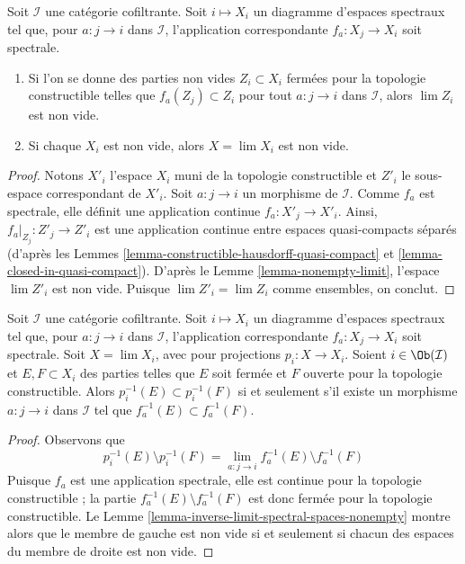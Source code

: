 \begin{lemma}
\label{lemma-inverse-limit-spectral-spaces-nonempty}
Soit $\mathcal{I}$ une catégorie cofiltrante. Soit $i \mapsto X_i$ un diagramme
d'espaces spectraux tel que, pour $a : j \to i$ dans $\mathcal{I}$,
l'application correspondante $f_a : X_j \to X_i$ soit spectrale.
\begin{enumerate}
\item Si l'on se donne des parties non vides $Z_i \subset X_i$ fermées pour
la topologie constructible telles que $f_a(Z_j) \subset Z_i$ pour tout
$a : j \to i$ dans $\mathcal{I}$, alors $\lim Z_i$ est non vide.
\item Si chaque $X_i$ est non vide, alors $X = \lim X_i$ est non vide.
\end{enumerate}
\end{lemma}

\begin{proof}
Notons $X'_i$ l'espace $X_i$ muni de la topologie constructible
et $Z'_i$ le sous-espace correspondant de $X'_i$.
Soit $a : j \to i$ un morphisme de $\mathcal{I}$. Comme $f_a$ est spectrale,
elle définit une application continue $f_a : X'_j \to X'_i$. Ainsi,
$f_a|_{Z_j} : Z'_j \to Z'_i$ est une application continue entre espaces
quasi-compacts séparés (d'après les
Lemmes \ref{lemma-constructible-hausdorff-quasi-compact} et
\ref{lemma-closed-in-quasi-compact}). D'après le
Lemme \ref{lemma-nonempty-limit}, l'espace $\lim Z'_i$ est non vide.
Puisque $\lim Z'_i = \lim Z_i$ comme ensembles, on conclut.
\end{proof}

\begin{lemma}
\label{lemma-inverse-limit-spectral-spaces-equal}
Soit $\mathcal{I}$ une catégorie cofiltrante. Soit $i \mapsto X_i$ un diagramme
d'espaces spectraux tel que, pour $a : j \to i$ dans $\mathcal{I}$,
l'application correspondante $f_a : X_j \to X_i$ soit spectrale. Soit
$X = \lim X_i$, avec pour projections $p_i : X \to X_i$. Soient
$i \in \Ob(\mathcal{I})$ et $E, F \subset X_i$ des parties telles que $E$ soit
fermée et $F$ ouverte pour la topologie constructible.
Alors $p_i^{-1}(E) \subset p_i^{-1}(F)$ si et seulement s'il existe un morphisme
$a : j \to i$ dans $\mathcal{I}$ tel que
$f_a^{-1}(E) \subset f_a^{-1}(F)$.
\end{lemma}

\begin{proof}
Observons que
$$
p_i^{-1}(E) \setminus p_i^{-1}(F) =
\lim_{a : j \to i} f_a^{-1}(E) \setminus f_a^{-1}(F)
$$
Puisque $f_a$ est une application spectrale, elle est continue pour la
topologie constructible ; la partie
$f_a^{-1}(E) \setminus f_a^{-1}(F)$ est donc fermée pour la topologie
constructible. Le
Lemme \ref{lemma-inverse-limit-spectral-spaces-nonempty}
montre alors que le membre de gauche est non vide si et seulement si chacun
des espaces du membre de droite est non vide.
\end{proof}

